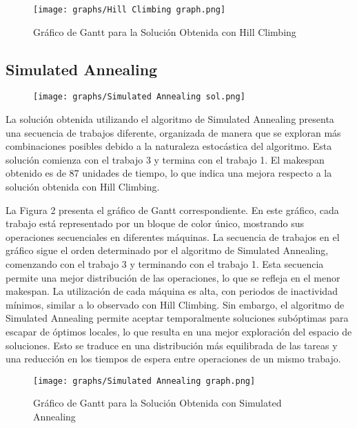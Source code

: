 \documentclass[11pt]{article}
\begin{document}
\begin{figure}[H]
\centering
\texttt{[image: graphs/Hill Climbing graph.png]}
\caption{Gráfico de Gantt para la Solución Obtenida con Hill Climbing}
\label{fig:miImagen}
\end{figure}

\subsection{Simulated Annealing} 

\begin{figure}[H]
  \centering
  \texttt{[image: graphs/Simulated Annealing sol.png]}
  \label{fig:miImagen}
\end{figure}

\noindent La solución obtenida utilizando el algoritmo de Simulated Annealing presenta una secuencia de trabajos diferente, organizada de manera que se exploran más combinaciones posibles debido a la naturaleza estocástica del algoritmo. Esta solución comienza con el trabajo 3 y termina con el trabajo 1. El makespan obtenido es de 87 unidades de tiempo, lo que indica una mejora respecto a la solución obtenida con Hill Climbing.

\vspace{1em} %
\noindent La Figura 2 presenta el gráfico de Gantt correspondiente. En este gráfico, cada trabajo está representado por un bloque de color único, mostrando sus operaciones secuenciales en diferentes máquinas. La secuencia de trabajos en el gráfico sigue el orden determinado por el algoritmo de Simulated Annealing, comenzando con el trabajo 3 y terminando con el trabajo 1. Esta secuencia permite una mejor distribución de las operaciones, lo que se refleja en el menor makespan. La utilización de cada máquina es alta, con periodos de inactividad mínimos, similar a lo observado con Hill Climbing. Sin embargo, el algoritmo de Simulated Annealing permite aceptar temporalmente soluciones subóptimas para escapar de óptimos locales, lo que resulta en una mejor exploración del espacio de soluciones. Esto se traduce en una distribución más equilibrada de las tareas y una reducción en los tiempos de espera entre operaciones de un mismo trabajo. 

\begin{figure}[H]
\centering
\texttt{[image: graphs/Simulated Annealing graph.png]}
\caption{Gráfico de Gantt para la Solución Obtenida con Simulated Annealing}
\label{fig:miImagen}
\end{figure}
\end{document}
